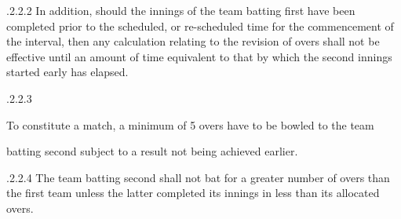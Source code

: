 \documentclass[12pt]{article}
\begin{document}
\vspace{\baselineskip}
\begin{adjustwidth}{1.97in}{0.06in}
{\fontsize{9pt}{10.8pt}.2.2.2 \tabto{1.96in} In addition, should the innings of the team batting first have been completed prior to the scheduled, or re-scheduled time for the commencement of the interval, then any calculation relating to the revision of overs shall not be effective until an amount of time equivalent to that by which the second innings started early has elapsed.\par}\par

\end{adjustwidth}


\vspace{\baselineskip}
\begin{adjustwidth}{0.0in}{-0.82in}
\begin{Center}
{\fontsize{9pt}{10.8pt}.2.2.3 \tabto{0.22in} {\fontsize{8pt}{9.6pt}\selectfont To constitute a match, a minimum of 5 overs have to be bowled to the team\par}\par}
\end{Center}\par

\end{adjustwidth}


\vspace{\baselineskip}
\begin{adjustwidth}{0.0in}{-0.76in}
\begin{Center}
{\fontsize{9pt}{10.8pt}\selectfont batting second subject to a result not being achieved earlier.\par}
\end{Center}\par

\end{adjustwidth}


\vspace{\baselineskip}
\begin{adjustwidth}{1.97in}{0.07in}
{\fontsize{9pt}{10.8pt}.2.2.4 \tabto{1.96in} The team batting second shall not bat for a greater number of overs than the first team unless the latter completed its innings in less than its allocated overs.\par}\par

\end{adjustwidth}
\end{document}
